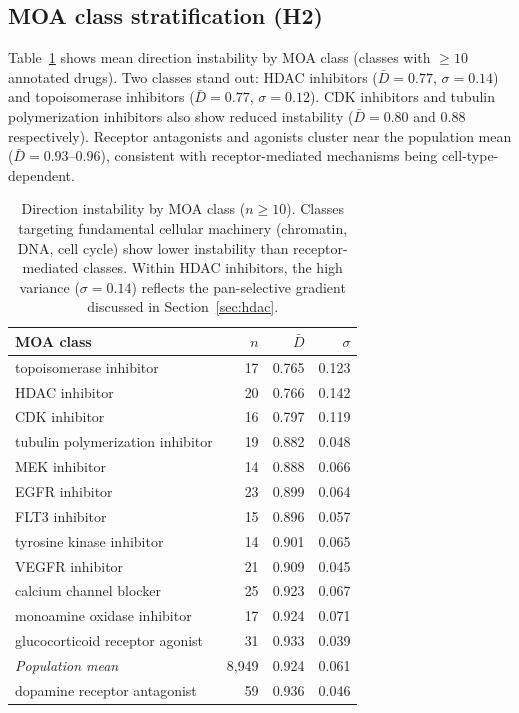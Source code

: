 \documentclass[11pt]{article}
\begin{document}
\subsection{MOA class stratification (H2)}

Table~\ref{tab:moa} shows mean direction instability by MOA class (classes
with $\geq10$ annotated drugs). Two classes stand out: HDAC inhibitors
($\bar{D} = 0.77$, $\sigma = 0.14$) and topoisomerase inhibitors
($\bar{D} = 0.77$, $\sigma = 0.12$). CDK inhibitors and tubulin
polymerization inhibitors also show reduced instability ($\bar{D} = 0.80$
and $0.88$ respectively). Receptor antagonists and agonists cluster near
the population mean ($\bar{D} = 0.93$--$0.96$), consistent with
receptor-mediated mechanisms being cell-type-dependent.

\begin{table}[t]
\centering
\caption{Direction instability by MOA class ($n \geq 10$). Classes targeting
fundamental cellular machinery (chromatin, DNA, cell cycle) show lower
instability than receptor-mediated classes. Within HDAC inhibitors, the
high variance ($\sigma = 0.14$) reflects the pan-selective gradient
discussed in Section~\ref{sec:hdac}.}
\label{tab:moa}
\small
\begin{tabular}{lrrr}
\toprule
MOA class & $n$ & $\bar{D}$ & $\sigma$ \\
\midrule
topoisomerase inhibitor & 17 & 0.765 & 0.123 \\
HDAC inhibitor & 20 & 0.766 & 0.142 \\
CDK inhibitor & 16 & 0.797 & 0.119 \\
tubulin polymerization inhibitor & 19 & 0.882 & 0.048 \\
MEK inhibitor & 14 & 0.888 & 0.066 \\
EGFR inhibitor & 23 & 0.899 & 0.064 \\
FLT3 inhibitor & 15 & 0.896 & 0.057 \\
tyrosine kinase inhibitor & 14 & 0.901 & 0.065 \\
VEGFR inhibitor & 21 & 0.909 & 0.045 \\
calcium channel blocker & 25 & 0.923 & 0.067 \\
monoamine oxidase inhibitor & 17 & 0.924 & 0.071 \\
glucocorticoid receptor agonist & 31 & 0.933 & 0.039 \\
\midrule
\emph{Population mean} & 8{,}949 & 0.924 & 0.061 \\
\midrule
dopamine receptor antagonist & 59 & 0.936 & 0.046 \\

\end{tabular}
\end{table}
\end{document}
